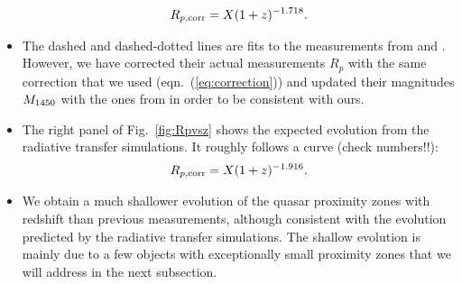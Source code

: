 \documentclass[iop]{emulateapj}
\begin{document}
\begin{itemize}
\begin{align*}
R_{p, \rm corr} = X (1+z)^{-1.718}. 
\end{align*}
\item The dashed and dashed-dotted lines are fits to the measurements from \citet{Carilli2010} and \citet{Venemans2015}. However, we have corrected their actual measurements $R_p$ with the same correction that we used (eqn.~(\ref{eq:correction})) and updated their magnitudes $M_{\rm 1450}$ with the ones from \citet{Banados2016} in order to be consistent with ours. 
\item The right panel of Fig.~\ref{fig:Rpvsz} shows the expected evolution from the radiative transfer simulations. It roughly follows a curve (check numbers!!):
\begin{align*}
R_{p, \rm corr} = X (1+z)^{-1.916}. 
\end{align*}
\item We obtain a much shallower evolution of the quasar proximity zones with redshift than previous measurements, although consistent with the evolution predicted by the radiative transfer simulations. The shallow evolution is mainly due to a few objects with exceptionally small proximity zones that we will address in the next subsection. 
\end{itemize}
\end{document}
